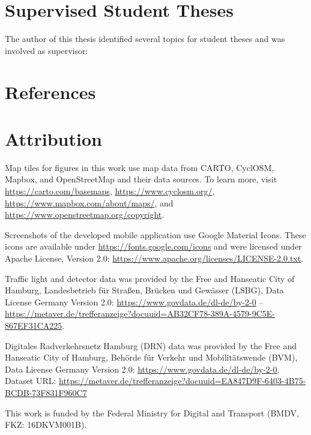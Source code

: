 \documentclass[
  ngerman,english, %
  BCOR=0mm,cdgeometry=no, %
  numbers=noenddot, %
  cd=fullcolor,
  headings=heavy,
  chapterpage=true,
  cdfont=off, %
  sfdefaults=false,
]{tudscrmanual}
\begin{document}
\section*{Supervised Student Theses}
The author of this thesis identified several topics for student theses and was involved as supervisor:
\printbibliography[heading=none,keyword={student},notkeyword={ownpaper}]
\pagebreak

\section*{References}
\printbibliography[heading=none,notkeyword={student},notkeyword={ownpaper,notrelated},notkeyword={ownpaper,related}]
\pagebreak

\newpage
{}

\section*{Attribution}\label{attribution}

Map tiles for figures in this work use map data from CARTO, CyclOSM, Mapbox, and OpenStreetMap and their data sources. To learn more, visit \url{https://carto.com/basemaps}, \url{https://www.cyclosm.org/}, \url{https://www.mapbox.com/about/maps/}, and \url{https://www.openstreetmap.org/copyright}.

Screenshots of the developed mobile application use Google Material Icons. These icons are available under \url{https://fonts.google.com/icons} and were licensed under Apache License, Version 2.0: \url{https://www.apache.org/licenses/LICENSE-2.0.txt}.

Traffic light and detector data was provided by the Free and Hanseatic City of Hamburg, Landesbetrieb für Straßen, Brücken und Gewässer (LSBG), Data License Germany Version 2.0: \url{https://www.govdata.de/dl-de/by-2-0} -- \url{https://metaver.de/trefferanzeige?docuuid=AB32CF78-389A-4579-9C5E-867EF31CA225}.

Digitales Radverkehrsnetz Hamburg (DRN) data was provided by the Free and Hanseatic City of Hamburg, Behörde für Verkehr und Mobilitätswende (BVM), Data License Germany Version 2.0: \url{https://www.govdata.de/dl-de/by-2-0}. Dataset URL: \url{https://metaver.de/trefferanzeige?docuuid=EA847D9F-6403-4B75-BCDB-73F831F960C7}

This work is funded by the Federal Ministry for Digital and Transport (BMDV, FKZ: 16DKVM001B).
\end{document}
